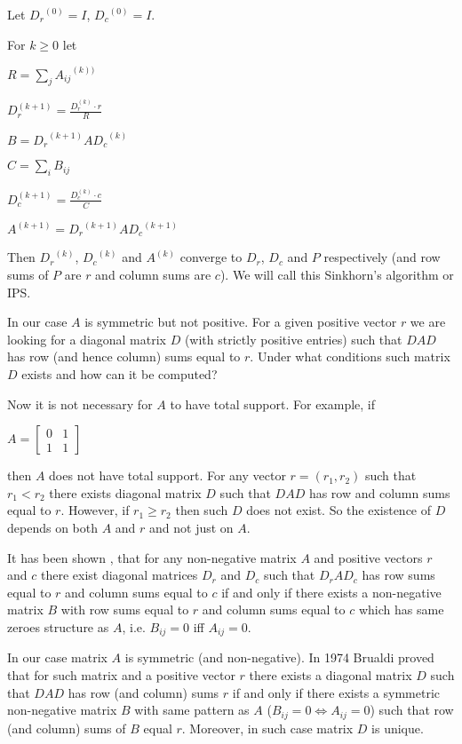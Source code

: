 \documentclass{article}
\begin{document}
 Let ${D_r}^{(0)} = I$, ${D_c}^{(0)} = I$. 
 
 For $k \ge 0$ let 
 
 $R = \sum_j {A_{ij}}^{(k))}$
 
 ${D_r^{(k+1)}} = \frac{D_r^{(k)} \cdot r}{R} $
 
 $B = {D_r}^{(k+1)} A {D_c}^{(k)}$
 
 $C = \sum_i {B_{ij}}$
 
  ${D_c^{(k+1)}} = \frac{D_c^{(k)} \cdot c}{C} $
  
   $A^{(k+1)} = {D_r}^{(k+1)} A {D_c}^{(k+1)}$

  
Then ${D_r}^{(k)}$, ${D_c}^{(k)}$ and $A^{(k)}$ converge to $D_r$, $D_c$ and $P$ respectively (and row sums of $P$ are $r$ and column sums are $c$). We will call this Sinkhorn's algorithm or IPS.

In our case $A$ is symmetric but not positive. For a given positive vector $r$ we are looking for a diagonal matrix $D$ (with strictly positive entries) such that $D A D$ has row (and hence column) sums equal to $r$. Under what conditions such matrix $D$ exists and how can it be computed?

Now it is not necessary for $A$ to have total support. For example, if 

$A=\begin{bmatrix}
    0 & 1 \\
    1 & 1
  \end{bmatrix}$
  
  then $A$ does not have total support. For any vector $r = (r_1 , r_2)$ such that $r_1 < r_2$ there exists diagonal matrix $D$ such that $D A D$ has row and column sums equal to $r$. However, if $r_1 \ge r_2$ then such $D$ does not exist. So the existence of $D$ depends on both $A$ and $r$ and not just on $A$.
  
  It has been shown \cite{menon1968}, \cite{sinkhorn1974} that for any non-negative matrix $A$ and positive vectors $r$ and $c$ there exist diagonal matrices $D_r$ and $D_c$ such that $D_r A D_c$ has row sums equal to $r$ and column sums equal to $c$ if and only if there exists a non-negative matrix $B$ with row sums equal to $r$ and column sums equal to $c$ which has same zeroes structure as $A$, i.e. $B_{ij} = 0$ iff $A_{ij} = 0$.
  
  In our case matrix $A$ is symmetric (and non-negative).  In 1974 Brualdi \cite{brualdi1974} proved that for such matrix and a positive vector $r$ there exists a diagonal matrix $D$ such that $DAD$ has row (and column) sums $r$ if and only if there exists a symmetric non-negative matrix $B$ with same pattern as $A$ ($B_{ij} = 0 \iff A_{ij} = 0$) such that row (and column) sums of $B$ equal $r$. Moreover, in such case matrix $D$ is unique.
  
\end{document}
